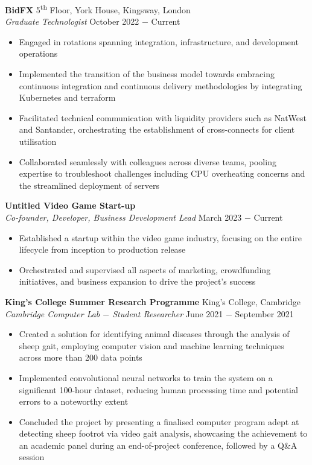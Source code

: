 \documentclass{article}
\begin{document}
\textbf{BidFX} \hfill 5\textsuperscript{th} Floor, York House, Kingsway, London\\
\textit{Graduate Technologist} \hfill October 2022 $-$ Current
\begin{itemize}
    \item Engaged in rotations spanning integration, infrastructure, and development operations
    \item Implemented the transition of the business model towards embracing continuous integration and continuous delivery methodologies by integrating Kubernetes and terraform
    \item Facilitated technical communication with liquidity providers such as NatWest and Santander, orchestrating the establishment of cross-connects for client utilisation
    \item Collaborated seamlessly with colleagues across diverse teams, pooling expertise to troubleshoot challenges including CPU overheating concerns and the streamlined deployment of servers
\end{itemize} \medskip

\textbf{Untitled Video Game Start-up}\\
\textit{Co-founder, Developer, Business Development Lead} \hfill March 2023 $-$ Current
\begin{itemize}
    \item Established a startup within the video game industry, focusing on the entire lifecycle from inception to production release
    \item Orchestrated and supervised all aspects of marketing, crowdfunding initiatives, and business expansion to drive the project's success
\end{itemize} \medskip

\textbf{King's College Summer Research Programme} \hfill King's College, Cambridge \\
\textit{Cambridge Computer Lab $-$ Student Researcher} \hfill June 2021 $-$ September 2021
\begin{itemize}
    \item Created a solution for identifying animal diseases through the analysis of sheep gait, employing computer vision and machine learning techniques across more than 200 data points
    \item Implemented convolutional neural networks to train the system on a significant 100-hour dataset, reducing human processing time and potential errors to a noteworthy extent
    \item Concluded the project by presenting a finalised computer program adept at detecting sheep footrot via video gait analysis, showcasing the achievement to an academic panel during an end-of-project conference, followed by a Q\&A session
\end{itemize} \medskip
\end{document}
